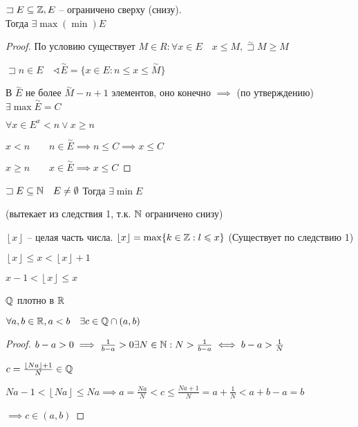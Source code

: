     \begin{corollary}
        $\sqsupset E \subseteq \mathbb{Z} , E $ -- ограничено сверху (снизу). \\Тогда $\exists \max(\min) E$
    \end{corollary}
    \begin{proof}
        По условию существует $M\in R: \forall x\in E\quad x\leqslant M, \overset{\sim }\sqsupset M \geqslant M$
        
        $\sqsupset n\in E\quad \sphericalangle \overset{\sim }E = \{x\in E: n\leqslant x\leqslant \overset{\sim }M\}$

        В $\overset{\sim }E$ не более $\overset{\sim }M - n+1$ элементов, оно конечно $\implies $ (по утверждению) $\exists \max \overset{\sim }E = C$

        $\forall x\in E^ x<n\vee x\geqslant n\qquad$

        $x<n\qquad n\in \overset{\sim }E \implies n\leqslant C \implies x\leqslant C$

        $x\geqslant n\qquad x\in \overset{\sim }E \implies x\leqslant C$
    \end{proof}
    \begin{corollary}
        $\sqsupset E\subseteq \mathbb{N} \quad E\neq \emptyset $ Тогда $\exists \min E$

        (вытекает из следствия 1, т.к. $\mathbb{N} $ ограничено снизу)
    \end{corollary}

    $\left\lfloor x \right\rfloor$ -- целая часть числа. $\left\lfloor x \right\rfloor = \max\{k\in \mathbb{Z} :l\leqslant x\}$ (Существует по следствию 1)

    $\left\lfloor x \right\rfloor\leqslant x< \left\lfloor x \right\rfloor +1    $

    $x-1< \left\lfloor x \right\rfloor \leqslant x$

    \begin{statement}
        $\mathbb{Q}$ плотно в $\mathbb{R}$

        $\forall a, b\in \mathbb{R}, a<b\quad \exists c\in \mathbb{Q}\cap (a,b)$
    \end{statement}
    \begin{proof}
        $b-a>0 \implies \frac{1}{b-a}>0\quad\newline \exists N\in \N: N>\frac{1}{b-a} \iff  b-a>\frac{1}{N}$
        
        $c = \frac{\left\lfloor Na \right\rfloor+1}{N} \in \mathbb{Q}$

        $Na-1<\left\lfloor Na \right\rfloor\leqslant Na \implies  a = \frac{Na}{N}<c\leqslant \frac{Na+1}{N} = a + \frac{1}{N}<a+b-a = b$

        $\implies c\in (a,b)$


    \end{proof}

